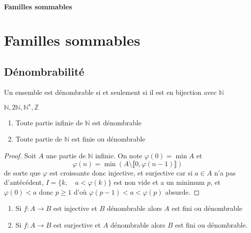 \ifsolo
    ~

    \vspace{1cm}

    \begin{center}
        \textbf{\LARGE Familles sommables} \\[1em]
    \end{center}
    \tableofcontents
\else
    \chapter{Familles sommables}

    \minitoc
\fi
\thispagestyle{empty}

\ifsolo \newpage \setcounter{page}{1} \fi

\section{Dénombrabilité}

\begin{dfn}
    Un ensemble est dénombrable si et seulement si il est en bijection avec $\mathbb N$
\end{dfn}

\begin{ex}
    $\mathbb N, 2\mathbb N, \mathbb N^\star, \mathbb Z$
\end{ex}

\begin{prop}
    \begin{enumerate}
        \item Toute partie infinie de $\mathbb N$ est dénombrable
        \item Toute partie de $\mathbb N$ est finie ou dénombrable
    \end{enumerate}
\end{prop}

\begin{proof}
    Soit $A$ une partie de $\mathbb N$ infinie. On note $\varphi(0)=\min A$ et \[
        \varphi(n)=\min (A\setminus \llbracket 0, \varphi(n-1)\rrbracket)
    \]
    de sorte que $\varphi$ est croissante donc injective, et surjective car si $a\in A$ n'a pas d'antécédent, $I=\{k, \quad a<\varphi(k)\}$ est non vide et a un minimum $p$, et $\varphi(0)<a$ donc $p\geq 1$ d'où $\varphi(p-1)< a<\varphi(p)$ absurde.
\end{proof}

\begin{prop}
    \begin{enumerate}
        \item Si $f:A\to B$ est injective et $B$ dénombrable alors $A$ est fini ou dénombrable
        \item Si $f:A\to B$ est surjective et $A$ dénombrable alors $B$ est fini ou dénombrable.
    \end{enumerate}
\end{prop}

